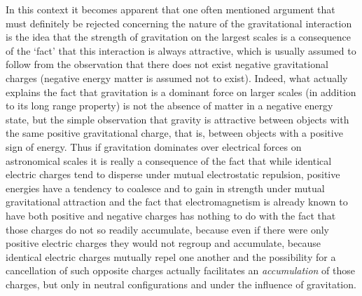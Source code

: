 \documentclass[notitlepage,12pt]{report}
\begin{document}
In this context it becomes apparent that one often mentioned argument that must definitely be rejected concerning the nature of the gravitational interaction is the idea that the strength of gravitation on the largest scales is a consequence of the `fact' that this interaction is always attractive, which is usually assumed to follow from the observation that there does not exist negative gravitational charges (negative energy matter is assumed not to exist). Indeed, what actually explains the fact that gravitation is a dominant force on larger scales (in addition to its long range property) is not the absence of matter in a negative energy state, but the simple observation that gravity is attractive between objects with the same positive gravitational charge, that is, between objects with a positive sign of energy. Thus if gravitation dominates over electrical forces on astronomical scales it is really a consequence of the fact that while identical electric charges tend to disperse under mutual electrostatic repulsion, positive energies have a tendency to coalesce and to gain in strength under mutual gravitational attraction and the fact that electromagnetism is already known to have both positive and negative charges has nothing to do with the fact that those charges do not so readily accumulate, because even if there were only positive electric charges they would not regroup and accumulate, because identical electric charges mutually repel one another and the possibility for a cancellation of such opposite charges actually facilitates an \textit{accumulation} of those charges, but only in neutral configurations and under the influence of gravitation.
\end{document}
